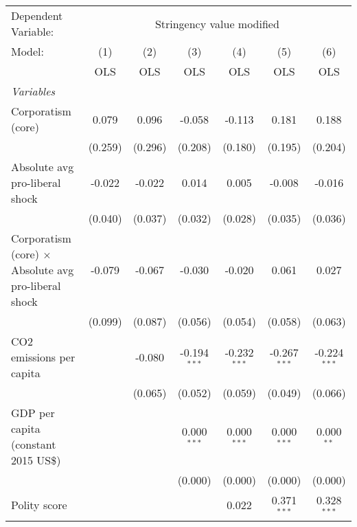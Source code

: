
\begingroup
\centering
\begin{tabular}{lcccccc}
   \toprule
   Dependent Variable: & \multicolumn{6}{c}{Stringency value modified}\\
   Model:                                                      & (1)     & (2)     & (3)            & (4)            & (5)            & (6)\\  
                                                               &  OLS    & OLS     & OLS            & OLS            & OLS            & OLS\\  
   \midrule
   \emph{Variables}\\
   Corporatism (core)                                          & 0.079   & 0.096   & -0.058         & -0.113         & 0.181          & 0.188\\   
                                                               & (0.259) & (0.296) & (0.208)        & (0.180)        & (0.195)        & (0.204)\\   
   Absolute avg pro-liberal shock                              & -0.022  & -0.022  & 0.014          & 0.005          & -0.008         & -0.016\\   
                                                               & (0.040) & (0.037) & (0.032)        & (0.028)        & (0.035)        & (0.036)\\   
   Corporatism (core) $\times$ Absolute avg pro-liberal shock  & -0.079  & -0.067  & -0.030         & -0.020         & 0.061          & 0.027\\   
                                                               & (0.099) & (0.087) & (0.056)        & (0.054)        & (0.058)        & (0.063)\\   
   CO2 emissions per capita                                    &         & -0.080  & -0.194$^{***}$ & -0.232$^{***}$ & -0.267$^{***}$ & -0.224$^{***}$\\   
                                                               &         & (0.065) & (0.052)        & (0.059)        & (0.049)        & (0.066)\\   
   GDP per capita (constant 2015 US\$)                         &         &         & 0.000$^{***}$  & 0.000$^{***}$  & 0.000$^{***}$  & 0.000$^{**}$\\   
                                                               &         &         & (0.000)        & (0.000)        & (0.000)        & (0.000)\\   
   Polity score                                                &         &         &                & 0.022          & 0.371$^{***}$  & 0.328$^{***}$\\   

\end{tabular}
